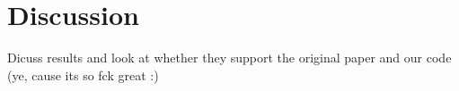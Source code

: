\section{Discussion}
Dicuss results and look at whether they support the original paper and our code (ye, cause its so fck great :)
